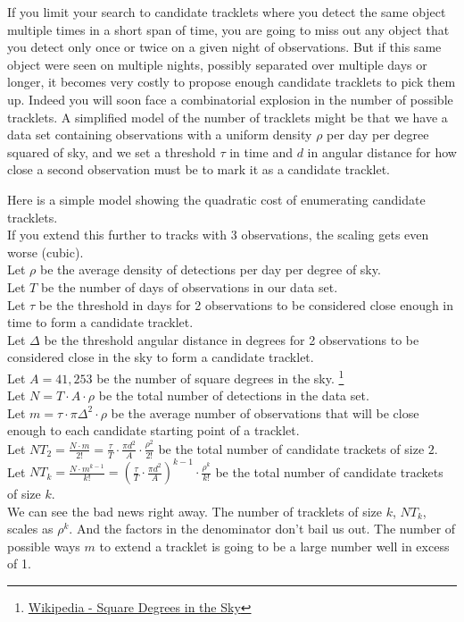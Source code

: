 If you limit your search to candidate tracklets where you detect the same object multiple times in a short span of time,
you are going to miss out any object that you detect only once or twice on a given night of observations.
But if this same object were seen on multiple nights, possibly separated over multiple days or longer, 
it becomes very costly to propose enough candidate tracklets to pick them up.
Indeed you will soon face a combinatorial explosion in the number of possible tracklets.
A simplified model of the number of tracklets might be that we have a data set containing 
observations with a uniform density $\rho$ per day per degree squared of sky,
and we set a threshold $\tau$ in time and $d$ in angular distance for how close a second observation must be to mark it as a candidate tracklet.

Here is a simple model showing the quadratic cost of enumerating candidate tracklets. \\
If you extend this further to tracks with 3 observations, the scaling gets even worse (cubic).\\
Let $\rho$ be the average density of detections per day per degree of sky.\\
Let $T$ be the number of days of observations in our data set.\\
Let $\tau$ be the threshold in days for 2 observations to be considered close enough in time to form a candidate tracklet.\\
Let $\Delta$ be the threshold angular distance in degrees for 2 observations to be considered close in the sky to form a candidate tracklet.\\
Let $A = 41,253$ be the number of square degrees in the sky.
\footnote{\href{https://en.wikipedia.org/wiki/Square_degree}{Wikipedia - Square Degrees in the Sky}}\\
Let $N = T \cdot A \cdot \rho $ be the total number of detections in the data set.\\
Let $\displaystyle{m = \tau \cdot \pi \Delta^2 \cdot \rho}$ be the average number of observations that will be close enough
to each candidate starting point of a tracklet.\\
Let $\displaystyle{NT_{2} = \frac{N \cdot m}{2!} = \frac{\tau}{T} \cdot \frac{\pi d^2}{A} \cdot \frac{\rho^{2}}{2!} }$ 
be the total number of candidate trackets of size $2$. \\
Let $\displaystyle{NT_{k} = \frac{N \cdot m^{k-1}}{k!} = \left( \frac{\tau}{T} \cdot \frac{\pi d^2}{A} \right)^{k-1} \cdot \frac{\rho^{k}}{k!} }$ 
be the total number of candidate trackets of size $k$. \\
We can see the bad news right away.
The number of tracklets of size $k$, $NT_{k}$, scales as $\rho^{k}$.
And the factors in the denominator don't bail us out.  
The number of possible ways $m$ to extend a tracklet is going to be a large number well in excess of 1.

